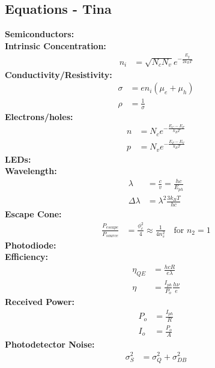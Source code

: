 \documentclass[landscape,a4paper]{article}
\begin{document}
\begin{multicols}{3}
	\section{Equations - Tina}
	\textbf{Semiconductors:}\\
	\hspace{3mm}\textbf{Intrinsic Concentration:}
	\begin{align}
		n_i &= \sqrt{N_c N_v} e^{-\frac{E_g}{2 k_B T}}
	\end{align}
	\hspace{3mm}\textbf{Conductivity/Resistivity:}
	\begin{align}
		\sigma &= e n_i (\mu_e + \mu_h)\\
		\rho &= \frac{1}{\sigma}
	\end{align}
	\hspace{3mm}\textbf{Electrons/holes:}
	\begin{align}
		n &= N_c e^{-\frac{E_C - E_F}{k_B T}}\\
		p &= N_v e^{-\frac{E_F - E_V}{k_B T}}
	\end{align}
	\textbf{LEDs:}\\
	\hspace{3mm}\textbf{Wavelength:}
	\begin{align}
		\lambda &= \frac{c}{v} = \frac{hc}{E_{ph}}\\
		\Delta \lambda &= \lambda^2 \frac{3 k_B T}{hc}
	\end{align}
	\hspace{3mm}\textbf{Escape Cone:}
	\begin{align}
		\frac{P_{escape}}{P_{source}} &= \frac{\phi_c^2}{4} \approx \frac{1}{4n_s^2}\quad \text{for } n_2=1
	\end{align}
	\textbf{Photodiode:}\\
	\hspace{3mm}\textbf{Efficiency:}
	\begin{align}
		\eta_{QE} &= \frac{hcR}{e\lambda}\\
		\eta &= \frac{I_{ph}}{P_o} \frac{h\nu}{e}
	\end{align}
	\hspace{3mm}\textbf{Received Power:}
	\begin{align}
		P_o &= \frac{I_{ph}}{R}\\
		I_o &= \frac{P_o}{A}
	\end{align}
	\hspace{3mm}\textbf{Photodetector Noise:}
	\begin{align}
		\sigma_S^2 &= \sigma_Q^2 + \sigma_{DB}^2\\

\end{align}
\end{multicols}
\end{document}
